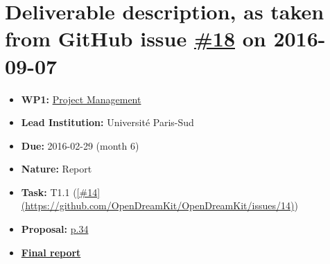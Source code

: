 \section*{\texorpdfstring{Deliverable description, as taken from GitHub
issue
\href{https://github.com/OpenDreamKit/OpenDreamKit/issues/18}{\#18} on
2016-09-07}{Deliverable description, as taken from GitHub issue \#18 on 2016-09-07}}\label{deliverable-description-as-taken-from-github-issues-18-on-2016-09-07}

\begin{itemize}
\tightlist
\item
  \textbf{WP1:}
  \href{https://github.com/OpenDreamKit/OpenDreamKit/tree/master/WP1}{Project
  Management}
\item
  \textbf{Lead Institution:} Université Paris-Sud
\item
  \textbf{Due:} 2016-02-29 (month 6)
\item
  \textbf{Nature:} Report
\item
  \textbf{Task:} T1.1
  (\href{https://github.com/OpenDreamKit/OpenDreamKit/issues/14}{{[}\#14{]}(https://github.com/OpenDreamKit/OpenDreamKit/issues/14)})
\item
  \textbf{Proposal:}
  \href{https://github.com/OpenDreamKit/OpenDreamKit/raw/master/Proposal/proposal-www.pdf}{p.34}
\item
  \textbf{\href{https://github.com/OpenDreamKit/OpenDreamKit/raw/master/WP1/D1.2/report-final.pdf}{Final
  report}}
\end{itemize}
